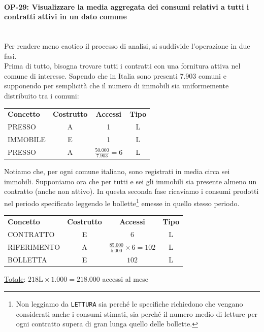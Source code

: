 \documentclass[a4paper,12pt]{report}
\begin{document}
\paragraph{OP-29: Visualizzare la media aggregata dei consumi relativi a tutti i contratti attivi in un dato comune}\mbox{}\\
    Per rendere meno caotico il processo di analisi, si suddivide l'operazione in due fasi.\\
    Prima di tutto, bisogna trovare tutti i contratti con una fornitura attiva nel comune di interesse. Sapendo che in Italia sono presenti 7.903 comuni e supponendo per semplicità che il numero di immobili sia uniformemente distribuito tra i comuni:
    \begin{center}
    \begin{tabular}{@{}l c  c  c@{}}
        \hline
        \textbf{Concetto} & \textbf{Costrutto} & \textbf{Accessi} & \textbf{Tipo} \\ [0.5ex]
        PRESSO & A & 1 & L \\
        IMMOBILE & E & 1 & L \\
        PRESSO & A & $\frac{50.000}{7.903} = 6$ & L \\
        \hline
    \end{tabular}
    \end{center}
    Notiamo che, per ogni comune italiano, sono registrati in media circa sei immobili. Supponiamo ora che per tutti e sei gli immobili sia presente almeno un contratto (anche non attivo). In questa seconda fase ricaviamo i consumi prodotti nel periodo specificato leggendo le bollette\footnote{Non leggiamo da \texttt{LETTURA} sia perché le specifiche richiedono che vengano considerati anche i consumi stimati, sia perché il numero medio di letture per ogni contratto supera di gran lunga quello delle bollette.} emesse in quello stesso periodo.
    \begin{center}
    \begin{tabular}{@{}l c  c  c@{}}
        \hline
        \textbf{Concetto} & \textbf{Costrutto} & \textbf{Accessi} & \textbf{Tipo} \\ [0.5ex]
        CONTRATTO & E & 6 & L \\
        RIFERIMENTO & A & $\frac{85.000}{5.000} \times 6 = 102$ & L \\
        BOLLETTA & E & $102$ & L \\
        \hline
    \end{tabular}
    \end{center}
    \underline{Totale}: $218\text{L} \times 1.000 = 218.000$ accessi al mese
\end{document}
